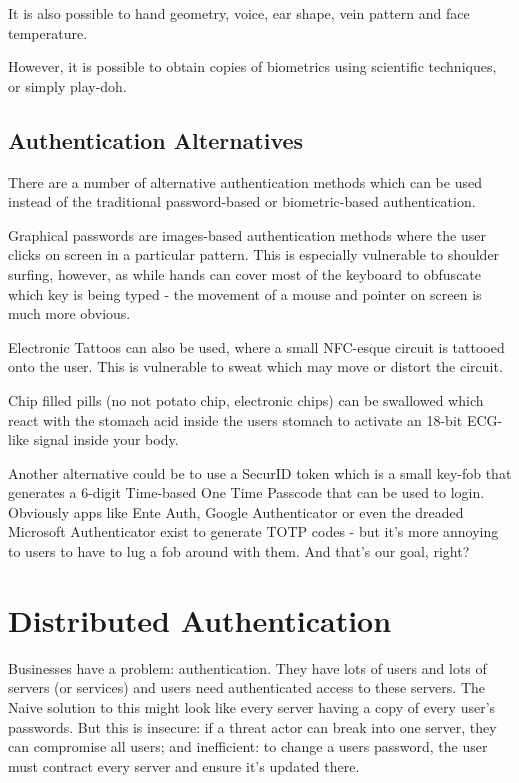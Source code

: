 It is also possible to hand geometry, voice, ear shape, vein pattern and face temperature.

However, it is possible to obtain copies of biometrics using scientific techniques, or simply play-doh. 

\subsection{Authentication Alternatives}
There are a number of alternative authentication methods which can be used instead of the traditional password-based or biometric-based authentication.

Graphical passwords are images-based authentication methods where the user clicks on screen in a particular pattern. This is especially vulnerable to shoulder surfing, however, as while hands can cover most of the keyboard to obfuscate which key is being typed - the movement of a mouse and pointer on screen is much more obvious.

Electronic Tattoos can also be used, where a small NFC-esque circuit is tattooed onto the user. This is vulnerable to sweat which may move or distort the circuit.

Chip filled pills (no not potato chip, electronic chips) can be swallowed which react with the stomach acid inside the users stomach to activate an 18-bit ECG-like signal inside your body.

Another alternative could be to use a SecurID token which is a small key-fob that generates a 6-digit Time-based One Time Passcode that can be used to login. Obviously apps like Ente Auth, Google Authenticator or even the dreaded Microsoft Authenticator exist to generate TOTP codes - but it's more annoying to users to have to lug a fob around with them. And that's our goal, right? 

\section{Distributed Authentication}
Businesses have a problem: authentication. They have lots of users and lots of servers (or services) and users need authenticated access to these servers. The Naive solution to this might look like every server having a copy of every user's passwords. But this is insecure: if a threat actor can break into one server, they can compromise all users; and inefficient: to change a users password, the user must contract every server and ensure it's updated there.

